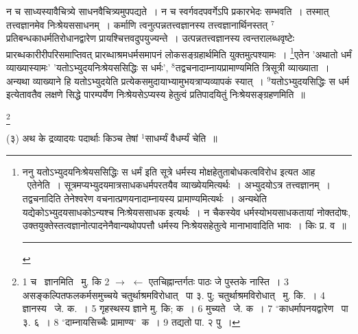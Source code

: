 \documentclass[11pt, openany]{book}
\newcommand\blfootnote[1]{%
 \begingroup
 \renewcommand\thefootnote{}\footnote{#1}%
 \addtocounter{footnote}{-1}%
 \endgroup
}
\begin{document}
न च साध्यस्यावैचित्र्ये साधनवैचित्र्यमुपपद्यते~। न च स्वर्गवदपवर्गेऽपि प्रकारभेदः सम्भवति~। तस्मात् तत्त्वज्ञानमेव निःश्रेयससाधनम्~। कर्माणि त्वनुत्पन्नतत्त्वज्ञानस्य तत्त्वज्ञानार्थिनस्तत् ${}^7$प्रतिबन्धकाधर्मतिरोधानद्वारेण प्रायश्चित्तवदुपयुज्यन्ते~। उत्पन्नतत्त्वज्ञानस्य त्वन्तरालब्धवृष्टेः प्रारब्धकारीरीपरिसमाप्तिवत् प्रारब्धाश्रमधर्मसमापनं लोकसङ्ग्रहार्थमिति युक्तमुत्पश्यामः~। \renewcommand{\thefootnote}{२}\footnote{ननु यतोऽभ्युदयनिःश्रेयससिद्धिः स धर्मं इति सूत्रे धर्मस्य मोक्षहेतुताबोधकत्वविरोध इत्यत आह \textendash\ एतेनेति~। सूत्रमप्यभ्युदयमात्रसाधकधर्मपरतयैव व्याख्येयमित्यर्थः~। अभ्युदयोऽत्र तत्त्वज्ञानम्~। तद्वचनादिति तेनेश्वरेण वचनात्प्रणयनादाम्नायस्य प्रामाण्यमित्यर्थः~। अन्यथेति यद्येकोऽभ्युदयसाधकोऽन्यश्च निःश्रेयससाधक इत्यर्थः~। न चैकस्येव धर्मस्योभयसाधकतायां नोक्तदोषः, उक्तयुक्तेस्तत्वज्ञानोत्पादनेनैवान्यथोपपत्तौ धर्मस्य निःश्रेयसहेतुत्वे मानाभावादिति भावः~। किः प्र. व~॥ \rule{0.4\linewidth}{0.5pt}}एतेन 'अथातो धर्मं व्याख्यास्यामः' 'यतोऽभ्युदयनिःश्रेयससिद्धिः स धर्मः', ${}^8$तद्वचनादाम्नायप्रामाण्यमिति त्रिसूत्री व्याख्याता~। अन्यथा व्याख्याने हि यतोऽभ्युदयेति प्रत्येकसमुदायाभ्यामुभयत्राप्यव्यापकं स्यात्~। ${}^9$यतोऽभ्युदयसिद्धिः स धर्म इत्येतावतैव लक्षणे सिद्धे पारम्पर्येण निःश्रेयसेऽप्यस्य हेतुत्वं प्रतिपादयितुं निःश्रेयसङ्ग्रहणमिति~॥

\blfootnote{1 च  \textendash\ ज्ञानमिति \textendash\ मु. कि 2 $\rightarrow$ $\leftarrow$ एतचिह्नान्तर्गतः पाठः जे पुस्तके नास्ति~। 3 असङ्कल्पितफलकर्मसमुच्चये चतुर्थाश्रमविरोधात्  \textendash\ पा ३. पु; चतुर्थाश्रमविरोधात्  \textendash\ मु. कि.~। 4 ज्ञानस्य  \textendash\ जे. क.~। 5 गृहस्थस्य ज्ञाने मु. कि; क~। 6 मुच्यते \textendash\ जे. क~। 7 ${}^\circ$काधर्मापनयद्वारेण  \textendash\ पा ३. ६~। 8 ${}^\circ$दाम्नायसिच्चैः प्रामाण्य$^\circ$\textendash\ क~। 9 तद्यतो पा. २ पु~।}

\newpage
\indent
\hangindent=2cm {\knu (३) अथ के द्रव्यादयः पदार्थाः किञ्च तेषां ${}^1$साधर्म्यं वैधर्म्यं चेति~॥}
\end{document}

